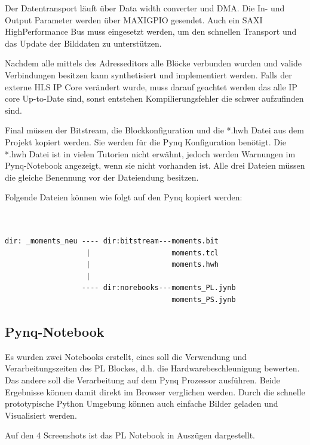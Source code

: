 \documentclass[a4paper]{report}
\begin{document}
Der Datentransport läuft über Data width converter und DMA. Die In- und Output Parameter werden über MAXIGPIO gesendet. Auch ein SAXI HighPerformance Bus muss eingesetzt werden, um den schnellen Transport und das Update der Bilddaten zu unterstützen. 

Nachdem alle mittels des Adresseditors alle Blöcke verbunden wurden und valide Verbindungen besitzen kann synthetisiert und implementiert werden. Falls der externe HLS IP Core verändert wurde, muss darauf geachtet werden das alle IP core Up-to-Date sind, sonst entstehen Kompilierungsfehler die schwer aufzufinden sind. 

Final müssen der Bitstream, die Blockkonfiguration und die *.hwh Datei aus dem Projekt kopiert werden. Sie werden für die Pynq Konfiguration benötigt. Die *.hwh Datei ist in vielen Tutorien nicht erwähnt, jedoch werden Warnungen im Pynq-Notebook angezeigt, wenn sie nicht vorhanden ist. Alle drei Dateien müssen die gleiche Benennung vor der Dateiendung besitzen. 

Folgende Dateien können wie folgt auf den Pynq kopiert werden:

\begin{verbatim}


dir: _moments_neu ---- dir:bitstream---moments.bit
                   |                   moments.tcl
                   |                   moments.hwh
                   |
                  ---- dir:norebooks---moments_PL.jynb
                                       moments_PS.jynb
\end{verbatim}

\subsection{Pynq-Notebook}
Es wurden zwei Notebooks erstellt, eines soll die Verwendung und Verarbeitungszeiten des PL Blockes, d.h. die Hardwarebeschleunigung bewerten. Das andere soll die Verarbeitung auf dem Pynq Prozessor ausführen. Beide Ergebnisse können damit direkt im Browser verglichen werden. Durch die schnelle prototypische Python Umgebung können auch einfache Bilder geladen und Visualisiert werden.

Auf den 4 Screenshots ist das PL Notebook in Auszügen dargestellt. 
\end{document}
